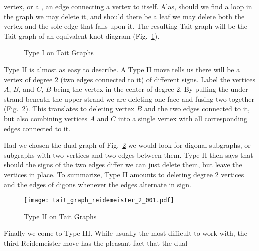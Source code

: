         vertex, or a , an edge connecting a vertex to itself. Alas,
        should we find a loop in the graph we may delete it, and should there
        be a leaf we may delete both the vertex and the sole edge that falls
        upon it. The resulting Tait graph will be the Tait graph of an
        equivalent knot diagram (Fig.~\ref{fig:tait_graph_reidemeister_1}).
        \begin{figure}
            \centering
            \caption{Type I on Tait Graphs}
            \label{fig:tait_graph_reidemeister_1}
        \end{figure}
        \par\hfill\par
        Type II is almost as easy to describe. A Type II move tells us there
        will be a vertex of degree 2 (two edges connected to it) of different
        signs. Label the vertices $A$, $B$, and $C$, $B$ being the vertex in
        the center of degree 2. By pulling the under strand beneath the upper
        strand we are deleting one face and fusing two together
        (Fig.~\ref{fig:tait_graph_reidemeister_2_001}). This translates to
        deleting vertex $B$ and the two edges connected to it, but also
        combining vertices $A$ and $C$ into a single vertex with all
        corresponding edges connected to it.
        \par\hfill\par
        Had we chosen the dual graph of
        Fig.~\ref{fig:tait_graph_reidemeister_2_001} we would look for digonal
        subgraphs, or subgraphs with two vertices and two edges between them.
        Type II then says that should the signs of the two edges differ we
        can just delete them, but leave the vertices in place. To summarize,
        Type II amounts to deleting degree 2 vertices and the edges of digons
        whenever the edges alternate in sign.
        \begin{figure}
            \centering
            \texttt{[image: tait\_graph\_reidemeister\_2\_001.pdf]}
            \caption{Type II on Tait Graphs}
            \label{fig:tait_graph_reidemeister_2_001}
        \end{figure}
        \par\hfill\par
        Finally we come to Type III. While usually the most difficult to work
        with, the third Reidemeister move has the pleasant fact that the dual
